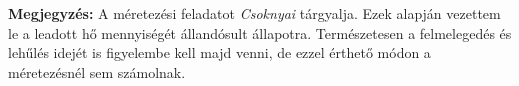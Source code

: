 
%



\begin{formal}
%
%
%
%
%
\textbf{Megjegyzés:} A méretezési feladatot \textit{Csoknyai} \cite[359.~o.]{Herz} tárgyalja. Ezek alapján vezettem le a leadott hő mennyiségét állandósult állapotra. Természetesen a felmelegedés és lehűlés idejét is figyelembe kell majd venni, de ezzel érthető módon a méretezésnél sem számolnak.

\end{formal}
